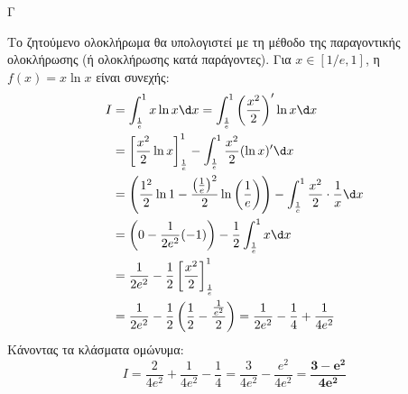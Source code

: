 \begin{thema}{Γ}
\begin{erwthma}
\item Το ζητούμενο ολοκλήρωμα θα υπολογιστεί με τη μέθοδο της παραγοντικής ολοκλήρωσης (ή ολοκλήρωσης κατά παράγοντες). Για $x \in [1/e, 1]$, η $f(x) = x \ln x$ είναι συνεχής:
\begin{align*}
I &= \int_{\frac{1}{e}}^{1} x \ln x \d x = \int_{\frac{1}{e}}^{1} \left( \frac{x^2}{2} \right)' \ln x \d x \\
&= \left[ \frac{x^2}{2} \ln x \right]_{\frac{1}{e}}^{1} - \int_{\frac{1}{e}}^{1} \frac{x^2}{2} (\ln x)' \d x \\
&= \left( \frac{1^2}{2} \ln 1 - \frac{\left(\frac{1}{e}\right)^2}{2} \ln\left(\frac{1}{e}\right) \right) - \int_{\frac{1}{e}}^{1} \frac{x^2}{2} \cdot \frac{1}{x} \d x \\
&= \left( 0 - \frac{1}{2e^2} (-1) \right) - \frac{1}{2} \int_{\frac{1}{e}}^{1} x \d x \\
&= \frac{1}{2e^2} - \frac{1}{2} \left[ \frac{x^2}{2} \right]_{\frac{1}{e}}^{1} \\
&= \frac{1}{2e^2} - \frac{1}{2} \left( \frac{1}{2} - \frac{\frac{1}{e^2}}{2} \right) = \frac{1}{2e^2} - \frac{1}{4} + \frac{1}{4e^2}
\end{align*}
Κάνοντας τα κλάσματα ομώνυμα:
\[ I = \frac{2}{4e^2} + \frac{1}{4e^2} - \frac{1}{4} = \frac{3}{4e^2} - \frac{e^2}{4e^2} = \boldsymbol{\frac{3-e^2}{4e^2}} \]
\end{erwthma}
\end{thema}

